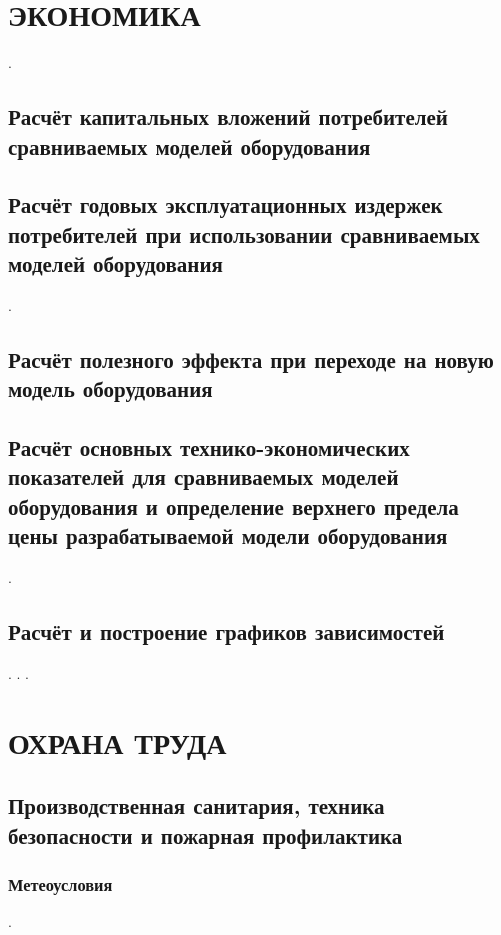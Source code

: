\section{ЭКОНОМИКА}
\newpage
.
\newpage

    \subsection{Расчёт капитальных вложений потребителей сравниваемых моделей оборудования}
    \newpage

    \subsection{Расчёт годовых эксплуатационных издержек потребителей при использовании сравниваемых моделей оборудования}
    \newpage
    .
    \newpage

    \subsection{Расчёт полезного эффекта при переходе на новую модель оборудования}
    \newpage

    \subsection{Расчёт основных технико-экономических показателей для сравниваемых моделей оборудования и определение верхнего предела цены разрабатываемой модели оборудования}
    \newpage
    .
    \newpage

    \subsection{Расчёт и построение графиков зависимостей}
    \newpage
    .
    \newpage
    .
    \newpage
    .
    \newpage

\section{ОХРАНА ТРУДА}

    \subsection{Производственная санитария, техника безопасности и пожарная профилактика}
    \newpage

        \subsubsection{Метеоусловия}
        \newpage
        .
        \newpage

